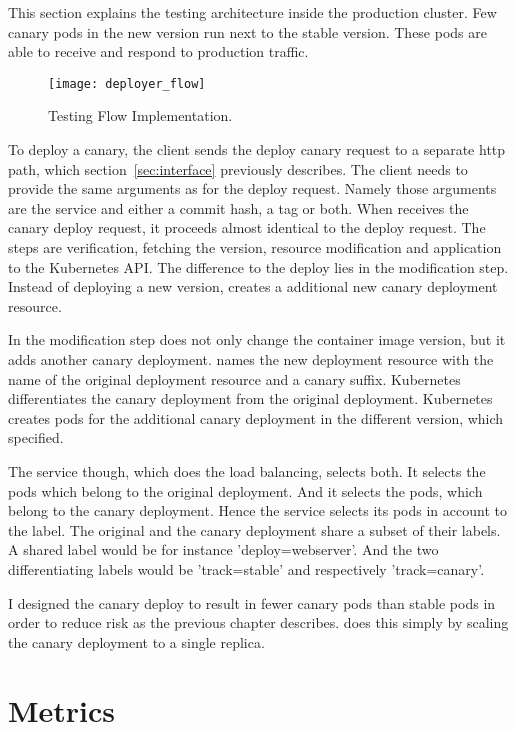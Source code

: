 This section explains the testing architecture inside the production cluster. Few canary
pods in the new version run next to the stable version. These pods are able to receive and
respond to production traffic.

\begin{figure}[htbp] \centering \texttt{[image: deployer\_flow]}
  \caption[nprtflow]{Testing Flow Implementation.}
  \label{fig:testing_flow}
\end{figure}


To deploy a canary, the client sends the deploy canary request to a separate http path,
which section~\ref{sec:interface} previously describes. The client needs to provide the
same arguments as for the deploy request. Namely those arguments are the service and
either a commit hash, a tag or both. When \deployer receives the canary deploy request, it
proceeds almost identical to the deploy request. The steps are verification, fetching the
version, resource modification and application to the Kubernetes API. The difference to
the deploy lies in the modification step. Instead of deploying a new version, \deployer
creates a additional new canary deployment resource.

In the modification step \deployer does not only change the container image version, but it
adds another canary deployment. \deployer names the new deployment resource with the name
of the original deployment resource and a canary suffix. Kubernetes differentiates the
canary deployment from the original deployment. Kubernetes creates pods for the additional
canary deployment in the different version, which \deployer specified.

The service though, which does the load balancing, selects both. It selects the pods which
belong to the original deployment. And it selects the pods, which belong to the canary
deployment. Hence the service selects its pods in account to the label. The original and
the canary deployment share a subset of their labels. A shared label would be for instance
'deploy=webserver'. And the two differentiating labels would be 'track=stable' and
respectively 'track=canary'.

I designed the canary deploy to result in fewer canary pods than stable pods in order to
reduce risk as the previous chapter describes. \deployer does this simply by scaling the
canary deployment to a single replica.

\section{Metrics}


